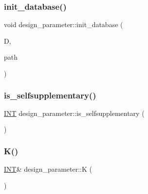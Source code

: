 \subsubsection{\texorpdfstring{init\+\_\+database()}{init\_database()}}
{\footnotesize\ttfamily void design\+\_\+parameter\+::init\+\_\+database (\begin{DoxyParamCaption}\item[{\mbox{\hyperlink{classdatabase}{database}} \&}]{D,  }\item[{\mbox{\hyperlink{galois_8h_ab6cc7b4aeb6ea31aba2b3fbfc83ff5e6}{B\+Y\+TE}} $\ast$}]{path }\end{DoxyParamCaption})}

\mbox{\label{classdesign__parameter_ac0ad1bf4fb71b9eab055d18503c4a7ce}} 
\subsubsection{\texorpdfstring{is\+\_\+selfsupplementary()}{is\_selfsupplementary()}}
{\footnotesize\ttfamily \mbox{\hyperlink{galois_8h_a09fddde158a3a20bd2dcadb609de11dc}{I\+NT}} design\+\_\+parameter\+::is\+\_\+selfsupplementary (\begin{DoxyParamCaption}{ }\end{DoxyParamCaption})}

\mbox{\label{classdesign__parameter_a0960cd8a9ce482e57708344085b8d5ee}} 
\subsubsection{\texorpdfstring{K()}{K()}}
{\footnotesize\ttfamily \mbox{\hyperlink{galois_8h_a09fddde158a3a20bd2dcadb609de11dc}{I\+NT}}\& design\+\_\+parameter\+::K (\begin{DoxyParamCaption}{ }\end{DoxyParamCaption})\hspace{0.3cm}{\ttfamily [inline]}}

\mbox{\label{classdesign__parameter_a53f496a4ef883ba3c06b500e48b238f5}} 
